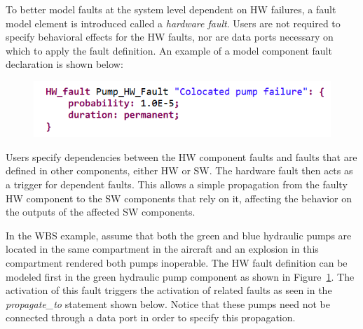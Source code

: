 To better model %
faults at the system level dependent on HW failures, a fault model element is introduced called a \textit{hardware fault}. Users are not required to specify behavioral effects for the HW faults, nor are data ports necessary on which to apply the fault definition. An example of a model component fault declaration is shown below:
\begin{figure}[h!]
	\vspace{-0.1in}
	\begin{center}
	\includegraphics[width=.6\textwidth]{images/hw_fault2.png}
	\end{center}
	\vspace{-0.3in}
	\label{fig:hwFault}
\end{figure}

Users specify dependencies between the HW component faults and faults that are defined in other components, either HW or SW. The hardware fault then acts as a trigger for dependent faults. This allows a simple propagation from the faulty HW component to the SW components that rely on it, affecting the behavior on the outputs of the affected SW components.

In the WBS example, assume that both the green and blue hydraulic pumps are located in the same compartment in the aircraft and an explosion in this compartment rendered both pumps inoperable.
The HW fault definition can be modeled first in the green hydraulic pump component as shown in Figure~\ref{fig:hwFault}. The activation of this fault triggers the activation of related faults as seen in the \textit{propagate\_to} statement shown below. %
Notice that these pumps need not be connected through a data port in order to specify this propagation. %

